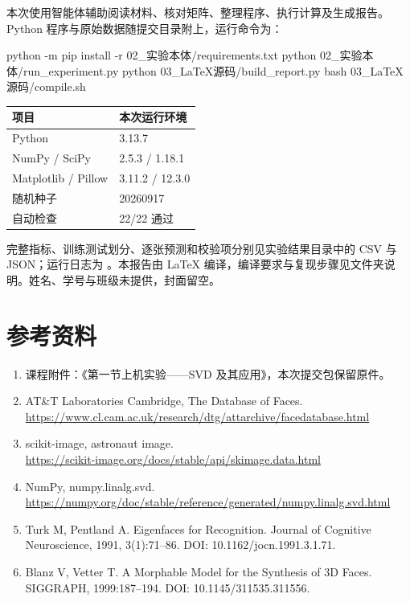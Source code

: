 \documentclass[UTF8,a4paper,11pt,fontset=fandol]{ctexart}
\begin{document}
本次使用智能体辅助阅读材料、核对矩阵、整理程序、执行计算及生成报告。Python 程序与原始数据随提交目录附上，运行命令为：
\par\noindent\begin{minipage}{\linewidth}\begin{code}
python -m pip install -r 02_实验本体/requirements.txt
python 02_实验本体/run_experiment.py
python 03_LaTeX源码/build_report.py
bash 03_LaTeX源码/compile.sh
\end{code}
\end{minipage}\par


\begin{center}\small\begin{tabular}{ll}\toprule{}项目 & 本次运行环境\\\midrule
Python & 3.13.7\\
NumPy / SciPy & 2.5.3 / 1.18.1\\
Matplotlib / Pillow & 3.11.2 / 12.3.0\\
随机种子 & 20260917\\
自动检查 & 22/22 通过\\\bottomrule\end{tabular}\end{center}

完整指标、训练测试划分、逐张预测和校验项分别见实验结果目录中的 CSV 与 JSON；运行日志为 。本报告由 LaTeX 编译，编译要求与复现步骤见文件夹说明。姓名、学号与班级未提供，封面留空。
\section*{参考资料}
\begin{enumerate}
\item 课程附件：《第一节上机实验——SVD 及其应用》，本次提交包保留原件。
\item AT\&T Laboratories Cambridge, The Database of Faces.\\\url{https://www.cl.cam.ac.uk/research/dtg/attarchive/facedatabase.html}
\item scikit-image, astronaut image.\\\url{https://scikit-image.org/docs/stable/api/skimage.data.html}
\item NumPy, numpy.linalg.svd.\\\url{https://numpy.org/doc/stable/reference/generated/numpy.linalg.svd.html}
\item Turk M, Pentland A. Eigenfaces for Recognition. Journal of Cognitive Neuroscience, 1991, 3(1):71--86. DOI: 10.1162/jocn.1991.3.1.71.
\item Blanz V, Vetter T. A Morphable Model for the Synthesis of 3D Faces. SIGGRAPH, 1999:187--194. DOI: 10.1145/311535.311556.
\end{enumerate}
\newpage\appendix
\end{document}
